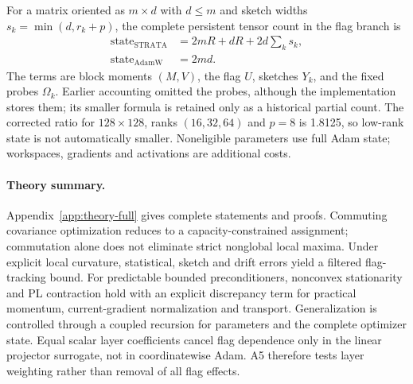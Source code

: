 For a matrix oriented as $m\times d$ with $d\le m$ and sketch widths $s_k=\min(d,r_k+p)$, the complete persistent tensor count in the flag branch is
\begin{align}
 \mathrm{state}_{\mathrm{STRATA}}&=2mR+dR+2d\sum_ks_k,\\
 \mathrm{state}_{\mathrm{AdamW}}&=2md.
\end{align}
The terms are block moments $(M,V)$, the flag $U$, sketches $Y_k$, and the fixed probes $\Omega_k$. Earlier accounting omitted the probes, although the implementation stores them; its smaller formula is retained only as a historical partial count. The corrected ratio for $128\times128$, ranks $(16,32,64)$ and $p=8$ is 1.8125, so low-rank state is not automatically smaller. Noneligible parameters use full Adam state; workspaces, gradients and activations are additional costs.

\paragraph{Theory summary.} Appendix~\ref{app:theory-full} gives complete statements and proofs. Commuting covariance optimization reduces to a capacity-constrained assignment; commutation alone does not eliminate strict nonglobal local maxima. Under explicit local curvature, statistical, sketch and drift errors yield a filtered flag-tracking bound. For predictable bounded preconditioners, nonconvex stationarity and PL contraction hold with an explicit discrepancy term for practical momentum, current-gradient normalization and transport. Generalization is controlled through a coupled recursion for parameters and the complete optimizer state. Equal scalar layer coefficients cancel flag dependence only in the linear projector surrogate, not in coordinatewise Adam. A5 therefore tests layer weighting rather than removal of all flag effects.

